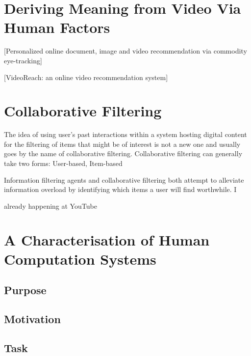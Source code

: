 \section{Deriving Meaning from Video Via Human Factors}
[Personalized online document, image and video recommendation via commodity eye-tracking]\cite{Xu:2008vb}

[VideoReach: an online video recommendation system]\cite{Mei:2007wa}

\section{Collaborative Filtering}

The idea of using user's past interactions within a system hosting digital content for the filtering of items that might be of interest is not a new one and usually goes by the name of collaborative filtering. 
Collaborative filtering can generally take two forms: User-based, Item-based

Information filtering agents and collaborative filtering both
attempt to alleviate information overload by identifying
which items a user will find worthwhile.  I


already happening at YouTube

\section{A Characterisation of Human Computation Systems}
\subsection{Purpose}
\subsection{Motivation}
\subsection{Task}

